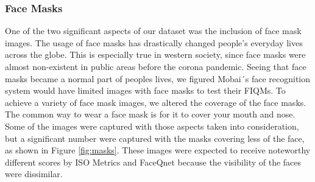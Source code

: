 \subsubsection*{Face Masks}
One of the two significant aspects of our dataset was the inclusion of face mask images. The usage of face masks has drastically changed people's everyday lives across the globe. This is especially true in western society, since face masks were almost non-existent in public areas before the corona pandemic. Seeing that face masks became a normal part of peoples lives, we figured Mobai´s face recognition system would have limited images with face masks to test their FIQMs. 
To achieve a variety of face mask images, we altered the coverage of the face masks. The common way to wear a face mask is for it to cover your mouth and nose. Some of the images were captured with those aspects taken into consideration, but a significant number were captured with the masks covering less of the face, as shown in Figure \ref{fig:masks}. These images were expected to receive noteworthy different scores by ISO Metrics and FaceQnet because the visibility of the faces were dissimilar.  
